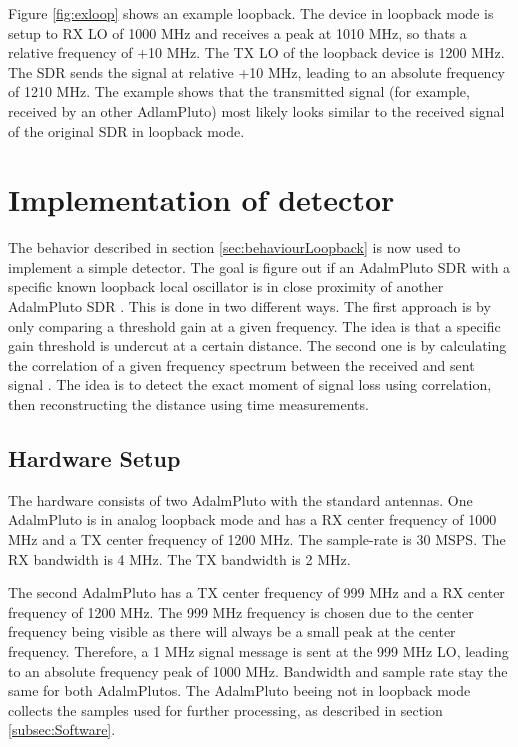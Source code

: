 \documentclass[journal]{IEEEtran}
\begin{document}
Figure \ref{fig:exloop} shows an example loopback.
The device in loopback mode is setup to RX LO of 1000 MHz and receives a peak at 1010 MHz, so thats a relative frequency of +10 MHz.
The TX LO of the loopback device is 1200 MHz.
The SDR sends the signal at relative +10 MHz, leading to an absolute frequency of 1210 MHz.
The example shows that the transmitted signal (for example, received by an other AdlamPluto) most likely  looks similar to the received signal of the original SDR in loopback mode.




\section{Implementation of detector}
\label{sec:implDetector}
The behavior described in section \ref{sec:behaviourLoopback} is now used to implement a simple detector. The goal is figure out if an AdalmPluto SDR with a specific known loopback local oscillator is in close proximity of another AdalmPluto SDR . 
This is done in two different ways.
The first approach is by only comparing a threshold gain at a given frequency.
The idea is that a specific gain threshold is undercut at a certain distance.
The second one is by calculating the correlation of a given frequency spectrum between the received and sent signal .
The idea is to detect the exact moment of signal loss using correlation, then reconstructing the distance using time measurements.


\subsection{Hardware Setup}
\label{subsec:hardware_setup}
The hardware consists of two AdalmPluto with the standard antennas. 
One AdalmPluto is in analog loopback mode and has a RX center frequency of 1000 MHz and a TX center frequency of 1200 MHz.
The sample-rate is 30 MSPS.
The RX bandwidth is 4 MHz.
The TX bandwidth is 2 MHz.

The second AdalmPluto has a TX center frequency of 999 MHz and a RX center frequency of 1200 MHz.
The 999 MHz frequency is chosen due to the center frequency being visible as there will always be a small peak at the center frequency.
Therefore, a 1 MHz signal message is sent at the 999 MHz LO, leading to an absolute frequency peak of 1000 MHz.
Bandwidth and sample rate stay the same for both AdalmPlutos.
The AdalmPluto beeing not in loopback mode collects the samples used for further processing, as described in section \ref{subsec:Software}.
\end{document}
